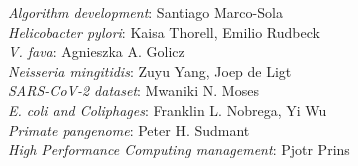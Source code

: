 \documentclass[pdflatex,mathphys]{jnl}%
\theoremstyle{thmstyleone}%
\theoremstyle{thmstyletwo}%
\theoremstyle{thmstylethree}%
\begin{document}
\emph{Algorithm development}: Santiago Marco-Sola \\ 
\emph{Helicobacter pylori}: Kaisa Thorell, Emilio Rudbeck \\ 
\emph{V. fava}: Agnieszka A. Golicz \\ 
\emph{Neisseria mingitidis}: Zuyu Yang, Joep de Ligt \\ 
\emph{SARS-CoV-2 dataset}: Mwaniki N. Moses \\ 
\emph{E. coli and Coliphages}: Franklin L. Nobrega, Yi Wu \\ 
\emph{Primate pangenome}: Peter H. Sudmant \\ 
\emph{High Performance Computing management}: Pjotr Prins \\ 
\end{document}
